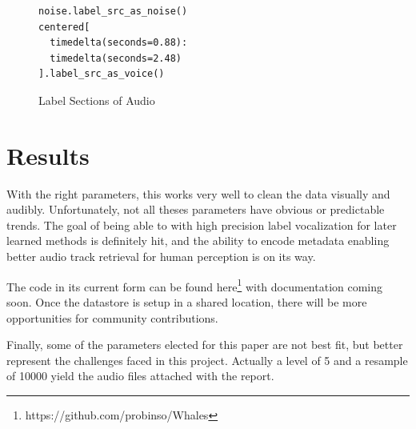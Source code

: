 \documentclass{article}
\begin{document}
\begin{multicols}{2}
\begin{figure}[H]
  \centering
  \begin{lstlisting}
noise.label_src_as_noise()
centered[
  timedelta(seconds=0.88):
  timedelta(seconds=2.48)
].label_src_as_voice()
\end{lstlisting}

  \caption{Label Sections of Audio}
  \label{fig:labeling}
\end{figure}

\section{Results}

With the right parameters, this works very well to clean the data visually and audibly. Unfortunately, not all theses parameters have obvious or predictable trends. The goal of being able to with high precision label vocalization for later learned methods is definitely hit, and the ability to encode metadata enabling better audio track retrieval for human perception is on its way.

The code in its current form can be found here\footnote{https://github.com/probinso/Whales} with documentation coming soon. Once the datastore is setup in a shared location, there will be more opportunities for community contributions.

Finally, some of the parameters elected for this paper are not best fit, but better represent the challenges faced in this project. Actually a level of 5 and a resample of 10000 yield the audio files attached with the report.

{}




\end{multicols}
\end{document}
